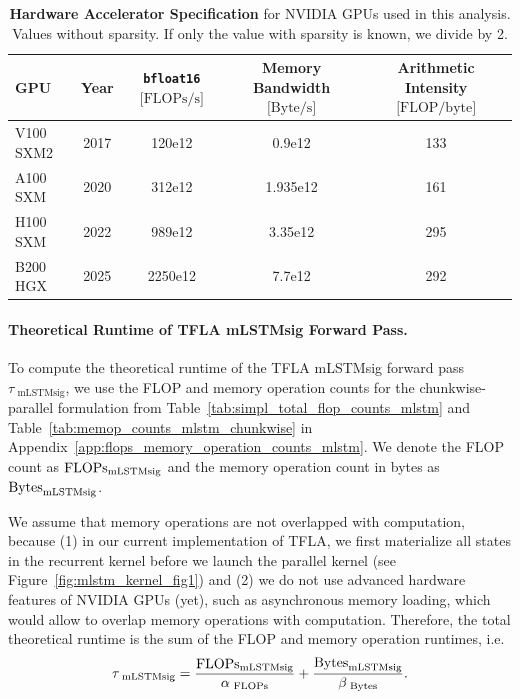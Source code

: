 \documentclass{article}
\begin{document}
    \begin{table}[H]
        \vspace{-0.3cm}
        \centering
        \caption{\label{tab:accelerator_specs} \textbf{Hardware Accelerator Specification} for NVIDIA GPUs used in this analysis. Values without sparsity. If only the value with sparsity is known, we divide by 2.}
        \vspace{0.2cm}
        \begin{tabular}{lcccc}
            \toprule
            GPU       & Year & \thead{\texttt{bfloat16}                  \\ $\text{[FLOPs/s]}$ }& \thead{Memory Bandwidth \\ $\text{[Byte/s]}$}   & \thead{Arithmetic Intensity \\ $\text{[FLOP/byte]}$}                                   \\
            \midrule
            V100 SXM2 & 2017 & 120e12                   & 0.9e12   & 133 \\
            A100 SXM  & 2020 & 312e12                   & 1.935e12 & 161 \\
            H100 SXM  & 2022 & 989e12                   & 3.35e12  & 295 \\
            B200 HGX  & 2025 & 2250e12                  & 7.7e12   & 292 \\
            \bottomrule
        \end{tabular}
    \end{table}

    \paragraph{Theoretical Runtime of TFLA mLSTMsig Forward Pass.}
    To compute the theoretical runtime of the TFLA mLSTMsig forward pass $\tau_\text{ mLSTMsig}$, we use the FLOP and memory operation counts for the chunkwise-parallel formulation from Table~\ref{tab:simpl_total_flop_counts_mlstm} and Table~\ref{tab:memop_counts_mlstm_chunkwise} in Appendix~\ref{app:flops_memory_operation_counts_mlstm}.
    We denote the FLOP count as $\text{FLOPs}_\text{mLSTMsig}$ and the memory operation count in bytes as $\text{Bytes}_\text{mLSTMsig}$.

    We assume that memory operations are not overlapped with computation, because (1) in our current implementation of TFLA, we first materialize all states in the recurrent kernel before we launch the parallel kernel (see Figure~\ref{fig:mlstm_kernel_fig1}) and (2) we do not use advanced hardware features of NVIDIA GPUs (yet), such as asynchronous memory loading, which would allow to overlap memory operations with computation.
    Therefore, the total theoretical runtime is the sum of the FLOP and memory operation runtimes, i.e.
    \begin{equation}
        \tau_\text{ mLSTMsig} = \frac{\text{FLOPs}_\text{mLSTMsig}}{\alpha_{\text{ FLOPs}{{}}}} + \frac{\text{Bytes}_\text{mLSTMsig}}{\beta_{\text{ Bytes}{{}}}}.
    \end{equation}
\end{document}
